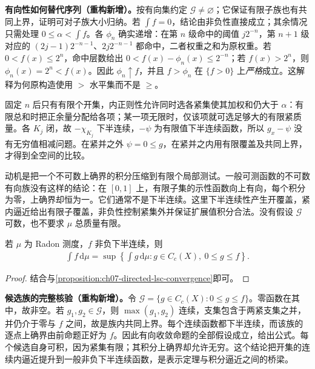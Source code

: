 \documentclass[../../main.tex]{subfiles}
\begin{document}
\begin{remark}
\textbf{有向性如何替代序列（重构新增）。}按有向集约定 $\mathscr G\ne\varnothing$；它保证有限子族也有共同上界，证明可对子族大小归纳。若 $\int f=0$，结论由非负性直接成立；其余情况只需处理 $0\leqslant\alpha<\int f$。各 $\phi_n$ 确实递增：在第 $n$ 级命中的阈值 $j2^{-n}$，第 $n+1$ 级对应的 $(2j-1)2^{-n-1}$、$2j2^{-n-1}$ 都命中，二者权重之和为原权重。若 $0<f(x)\leqslant2^n$，命中层数给出 $0<f(x)-\phi_n(x)\leqslant2^{-n}$；若 $f(x)>2^n$，则 $\phi_n(x)=2^n<f(x)$。因此 $\phi_n\uparrow f$，并且 $f>\phi_n$ 在 $\{f>0\}$ 上\emph{严格}成立。这解释为何原构造使用 $>$ 水平集而不是 $\geqslant$。

固定 $n$ 后只有有限个开集，内正则性允许同时选各紧集使其加权和仍大于 $\alpha$：有限总和时把正余量分配给各项；某一项无限时，仅该项就可选足够大的有限紧质量。各 $K_j$ 闭，故 $-\chi_{K_j}$ 下半连续，$-\psi$ 为有限值下半连续函数，所以 $g_x-\psi$ 没有无穷值相减问题。在紧并之外 $\psi=0\leqslant g$，在紧并之内用有限覆盖及共同上界，才得到全空间的比较。

动机是把一个不可数上确界的积分压缩到有限个局部测试。一般可测函数的不可数有向族没有这样的结论：在 $[0,1]$ 上，有限子集的示性函数向上有向，每个积分为零，上确界却恒为一。它们通常不是下半连续。这里下半连续性产生开覆盖，紧内逼近给出有限子覆盖，非负性控制紧集外并保证扩展值积分合法。没有假设 $\mathscr G$ 可数，也不要求 $\mu$ 总质量有限。
\end{remark}

\begin{corollary}\label{corollary:ch07-lsc-integral-minorants}
若 $\mu$ 为 Radon 测度，$f$ 非负下半连续，则
\begin{align*}
\int f\,\mathrm d\mu=\sup\left\{\int g\,\mathrm d\mu:g\in C_c(X),\ 0\leqslant g\leqslant f\right\}.
\end{align*}
\end{corollary}
\begin{proof}
结合与\cref{proposition:ch07-directed-lsc-convergence}即可。
\end{proof}
\begin{remark}
\textbf{候选族的完整核验（重构新增）。}令 $\mathscr G=\{g\in C_c(X):0\leqslant g\leqslant f\}$。零函数在其中，故非空。若 $g_1,g_2\in\mathscr G$，则 $\max(g_1,g_2)$ 连续，支集包含于两紧支集之并，并仍介于零与 $f$ 之间，故是族内共同上界。每个连续函数都下半连续，而该族的逐点上确界由前命题正好为 $f$。因此有向收敛命题的全部假设成立，给出公式。每个候选自身可积，因为紧集有限；其积分上确界却允许无穷。这个结论把开集的连续内逼近提升到一般非负下半连续函数，是表示定理与积分逼近之间的桥梁。
\end{remark}
\end{document}
